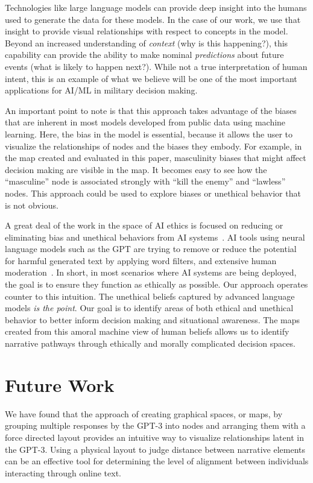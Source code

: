 \documentclass[11pt,dvipdfm]{article}
\begin{document}
Technologies like large language models can provide deep insight into the humans used to generate the data for these models. In the case of our work, we use that insight to provide visual  relationships with respect to concepts in the model. Beyond an increased understanding of \textit{context} (why is this happening?), this capability can provide the ability to make nominal  \textit{predictions} about future events (what is likely to happen next?). While not a true interpretation of human intent, this is an example of what we believe will be one of the most important applications for AI/ML in military decision making. 

An important point to note is that this approach takes advantage of the biases that are inherent in most models developed from public data using machine learning. Here, the bias in the model is essential, because it allows the user to visualize the relationships of  nodes and the biases they embody. For example, in the map created and evaluated in this paper, masculinity biases that might affect decision making are visible in the map. It becomes easy to see how the \enquote{masculine} node is associated strongly with \enquote{kill the enemy} and \enquote{lawless} nodes. This approach could be used to explore biases or unethical behavior that is not obvious.

A great deal of the work in the space of AI ethics is focused on reducing or eliminating bias and unethical behaviors from AI systems~\cite{mehrabi2021survey}. AI tools using neural language models such as the GPT are trying to remove or reduce the potential for harmful generated text by applying word filters, and extensive human moderation~\cite{quach_2021}. In short, in most scenarios where AI systems are being deployed, the goal is to ensure they function as ethically as possible. Our approach operates counter to this intuition. The unethical beliefs captured by advanced language models \textit{is the point}. Our goal is to identify areas of both ethical and unethical behavior to better inform decision making and situational awareness. The maps created from this amoral machine view of human beliefs allows us to identify narrative pathways through ethically and morally complicated decision spaces.

\section{Future Work}
\label{sec:future}
We have found that the approach of creating graphical spaces, or maps, by grouping multiple responses by the GPT-3 into nodes and arranging them with a force directed layout provides an intuitive way to visualize relationships latent in the GPT-3. Using a physical layout to judge distance between narrative elements can be an effective tool for determining the level of alignment between individuals interacting through online text. 
\end{document}
